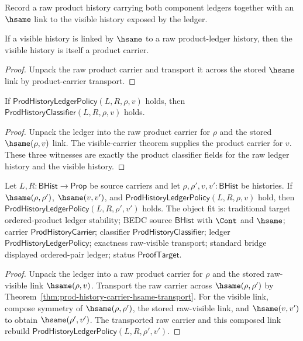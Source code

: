 \begin{definition}
\label{def:prod-ledger-policy}
Record a raw product history carrying both component ledgers together with an
\(\hsame\) link to the visible history exposed by the ledger.
\end{definition}

\begin{theorem}
\label{thm:prod-ledger-visible-carrier}
If a visible history is linked by \(\hsame\) to a raw product-ledger history,
then the visible history is itself a product carrier.
\end{theorem}
\begin{proof}
Unpack the raw product carrier and transport it across the stored \(\hsame\)
link by product-carrier transport.
\end{proof}

\begin{theorem}
\label{thm:prod-ledger-raw-visible-classifier}
If $\mathsf{ProdHistoryLedgerPolicy}(L,R,\rho,v)$ holds, then
$\mathsf{ProdHistoryClassifier}(L,R,\rho,v)$ holds.
\end{theorem}
\begin{proof}
Unpack the ledger into the raw product carrier for $\rho$ and the stored
$\hsame(\rho,v)$ link. The visible-carrier theorem supplies the product
carrier for $v$. These three witnesses are exactly the product classifier
fields for the raw ledger history and the visible history.
\end{proof}

\begin{theorem}
\label{thm:prod-ledger-hsame-transport}
Let $L,R:\mathsf{BHist}\to\mathsf{Prop}$ be source carriers and let
$\rho,\rho',v,v':\mathsf{BHist}$ be histories. If $\hsame(\rho,\rho')$,
$\hsame(v,v')$, and $\mathsf{ProdHistoryLedgerPolicy}(L,R,\rho,v)$ hold, then
$\mathsf{ProdHistoryLedgerPolicy}(L,R,\rho',v')$ holds. The object fit is:
traditional target ordered-product ledger stability; BEDC source
$\mathsf{BHist}$ with $\Cont$ and $\hsame$; carrier
$\mathsf{ProdHistoryCarrier}$; classifier $\mathsf{ProdHistoryClassifier}$;
ledger $\mathsf{ProdHistoryLedgerPolicy}$; exactness raw-visible transport;
standard bridge displayed ordered-pair ledger; status $\mathsf{ProofTarget}$.
\end{theorem}
\begin{proof}
Unpack the ledger into a raw product carrier for $\rho$ and the stored
raw-visible link $\hsame(\rho,v)$. Transport the raw carrier across
$\hsame(\rho,\rho')$ by Theorem~\ref{thm:prod-history-carrier-hsame-transport}.
For the visible link, compose symmetry of $\hsame(\rho,\rho')$, the stored
raw-visible link, and $\hsame(v,v')$ to obtain $\hsame(\rho',v')$. The
transported raw carrier and this composed link rebuild
$\mathsf{ProdHistoryLedgerPolicy}(L,R,\rho',v')$.
\end{proof}

